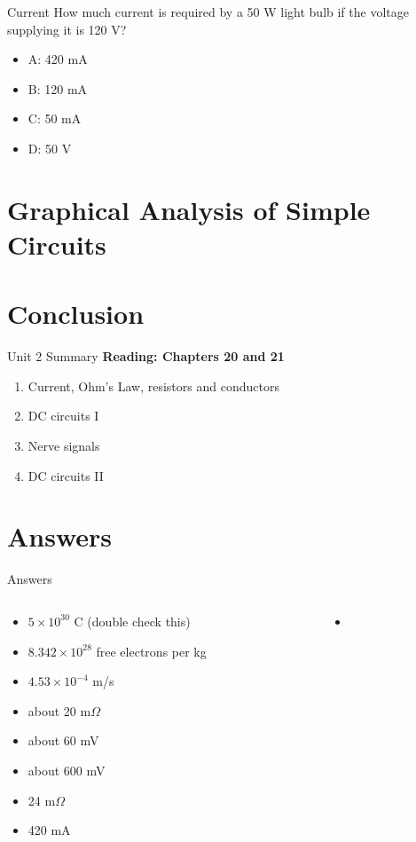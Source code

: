 \documentclass{beamer}
\begin{document}
\begin{frame}{Current}
How much current is required by a 50 W light bulb if the voltage supplying it is 120 V?
\begin{itemize}
\item A: 420 mA
\item B: 120 mA
\item C: 50 mA
\item D: 50 V
\end{itemize}
\end{frame}

\section{Graphical Analysis of Simple Circuits}

\section{Conclusion}

\begin{frame}{Unit 2 Summary}
\textbf{Reading: Chapters 20 and 21}
\begin{enumerate}
\item Current, Ohm's Law, resistors and conductors
\item DC circuits I
\item Nerve signals
\item \alert{DC circuits II}
\end{enumerate}
\end{frame}

\section{Answers}

\begin{frame}{Answers}
\tiny
\begin{columns}[T]
\begin{column}{0.5\textwidth}
\begin{itemize}
\item $5 \times 10^{30}$ C (double check this)
\item $8.342 \times 10^{28}$ free electrons per kg
\item $4.53 \times 10^{-4}$ m/s
\item about 20 m$\Omega$
\item about 60 mV
\item about 600 mV
\item 24 m$\Omega$
\item 420 mA
\end{itemize}
\end{column}
\begin{column}{0.5\textwidth}
\begin{itemize}
\item 
\end{itemize}
\end{column}
\end{columns}
\end{frame}
\end{document}

